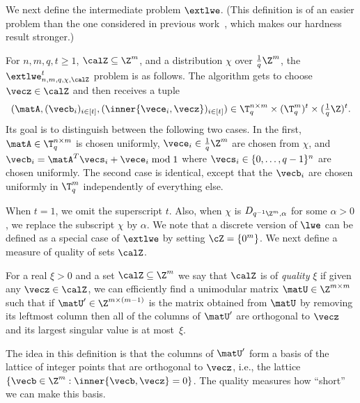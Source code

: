 We next define the intermediate problem $\extlwe$. (This definition is
of an easier problem than the one considered in previous
work~\cite{DBLP:conf/pkc/Alperin-SheriffP12}, which makes our hardness result stronger.)

\begin{definition}\label{def:extlwe}
For $n,m,q,t \ge 1$, $\calZ \subseteq \Z^m$, and a distribution $\chi$ over $\frac{1}{q}\Z^m$, the $\extlwe^t_{n,m,q,\chi,\calZ}$ problem is as follows.
The algorithm gets to choose $\vecz \in \calZ$ and then receives a tuple
\[
(\matA,(\vecb_i)_{i \in [t]},(\inner{\vece_i,\vecz})_{i \in [t]}) \in \T_q^{n \times m} \times (\T_q^m)^t \times ({\textstyle \frac 1 q} \Z)^t.
\]
Its goal is to distinguish between the following two cases.
In the first, $\matA \in \T_q^{n \times m}$ is chosen uniformly,
$\vece_i \in {\textstyle \frac 1 q}\Z^m$ are chosen from $\chi$,
and $\vecb_i = \matA^T \vecs_i + \vece_i \bmod 1$ where $\vecs_i \in \{0,\ldots,q-1\}^n$ are
chosen uniformly.
The second case is identical, except that the $\vecb_i$ are chosen uniformly in $\T_q^m$ independently of everything else. 
\end{definition}


When $t=1$, we omit the superscript $t$. Also, when $\chi$ is $D_{q^{-1}\Z^{m},\alpha}$ for some $\alpha>0$, we replace the
subscript $\chi$ by $\alpha$.
%
We note that a discrete version of $\lwe$ can be defined as a special case of $\extlwe$ by setting $\cZ = \{ 0^m \}$.
%
We next define a measure of quality of sets $\calZ$.



\begin{definition}\label{def:qualityofhintset}
For a real $\xi>0$ and a set $\calZ \subseteq \Z^m$ we say that $\calZ$ is of \emph{quality} $\xi$
if given any $\vecz \in \calZ$, we can efficiently find a unimodular matrix
$\matU \in \Z^{m \times m}$ such that if $\matU'\in \Z^{m \times (m-1)}$ is the matrix obtained
from $\matU$ by removing its leftmost column then all of the columns of $\matU'$ are orthogonal to $\vecz$
and its largest singular value is at most~$\xi$.
\end{definition}

The idea in this definition is that the columns of $\matU'$ 
form a basis of the lattice of integer points that are orthogonal
to $\vecz$, i.e., the lattice $\{\vecb \in \Z^m:
  \inner{\vecb,\vecz} = 0\}$. The quality measures
	how ``short'' we can make this basis.

